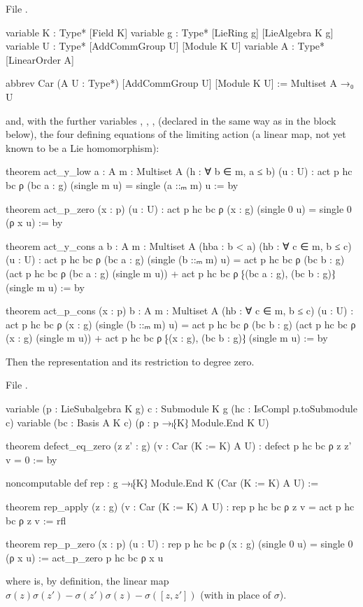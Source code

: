 File .
\begin{leancode}
variable {K : Type*} [Field K]
variable {g : Type*} [LieRing g] [LieAlgebra K g]
variable {U : Type*} [AddCommGroup U] [Module K U]
variable {A : Type*} [LinearOrder A]

abbrev Car (A U : Type*) [AddCommGroup U] [Module K U] := Multiset A →₀ U
\end{leancode}
and, with the further variables , , ,  (declared in the same way as in the
 block below), the four defining equations of the limiting action  (a linear map, not yet known to be a Lie
homomorphism):
\begin{leancode}
theorem act_y_low {a : A} {m : Multiset A} (h : ∀ b ∈ m, a ≤ b) (u : U) :
    act p hc bc ρ (bc a : g) (single m u) = single (a ::ₘ m) u := by

theorem act_p_zero (x : p) (u : U) :
    act p hc bc ρ (x : g) (single 0 u) = single 0 (ρ x u) := by

theorem act_y_cons {a b : A} {m : Multiset A} (hba : b < a) (hb : ∀ c ∈ m, b ≤ c) (u : U) :
    act p hc bc ρ (bc a : g) (single (b ::ₘ m) u) =
      act p hc bc ρ (bc b : g) (act p hc bc ρ (bc a : g) (single m u)) +
        act p hc bc ρ ⁅(bc a : g), (bc b : g)⁆ (single m u) := by

theorem act_p_cons (x : p) {b : A} {m : Multiset A} (hb : ∀ c ∈ m, b ≤ c) (u : U) :
    act p hc bc ρ (x : g) (single (b ::ₘ m) u) =
      act p hc bc ρ (bc b : g) (act p hc bc ρ (x : g) (single m u)) +
        act p hc bc ρ ⁅(x : g), (bc b : g)⁆ (single m u) := by
\end{leancode}
Then the representation and its restriction to degree zero.

File .
\begin{leancode}
variable (p : LieSubalgebra K g) {c : Submodule K g} (hc : IsCompl p.toSubmodule c)
variable (bc : Basis A K c) (ρ : p →ₗ⁅K⁆ Module.End K U)

theorem defect_eq_zero (z z' : g) (v : Car (K := K) A U) : defect p hc bc ρ z z' v = 0 := by

noncomputable def rep : g →ₗ⁅K⁆ Module.End K (Car (K := K) A U) :=

theorem rep_apply (z : g) (v : Car (K := K) A U) : rep p hc bc ρ z v = act p hc bc ρ z v := rfl

theorem rep_p_zero (x : p) (u : U) :
    rep p hc bc ρ (x : g) (single 0 u) = single 0 (ρ x u) :=
  act_p_zero p hc bc ρ x u
\end{leancode}
where  is, by definition, the linear map
$\sigma(z)\sigma(z') - \sigma(z')\sigma(z) - \sigma([z,z'])$ (with  in place of $\sigma$).

